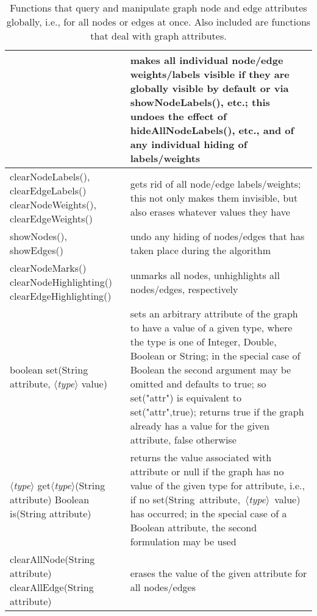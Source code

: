 \begin{table}
\begin{tabular}{| m{} | m{} |}
{    }
    &
    makes all individual
    node/edge weights/labels visible if they are globally visible by default
    or via \textsf{showNodeLabels()}, etc.;
    this undoes the effect of \textsf{hideAllNodeLabels()}, etc., and of
    any individual hiding of labels/weights
    \\ \hline
    \shortstack[l]{
      \textsf{clearNodeLabels(), clearEdgeLabels()}\\
      \textsf{clearNodeWeights(), clearEdgeWeights()}
    }
    &
    gets rid of all node/edge labels/weights; this not only makes them invisible,
    but also erases whatever values they have
    \\ \hline
    \textsf{showNodes(), showEdges()}
    &
    undo any hiding of nodes/edges that has taken place during the algorithm
    \\ \hline
    \shortstack[l]{
      \textsf{clearNodeMarks()}\\
      \textsf{clearNodeHighlighting()}\\
      \textsf{clearEdgeHighlighting()}
    }
    &
    unmarks all nodes, unhighlights all nodes/edges, respectively
    \\ \hline
    \textsf{boolean set(String attribute, $\langle$\emph{type}$\rangle$ value)}
    &
    sets an arbitrary attribute of the graph to have a value of a given type, where
    the type is one of \textsf{Integer}, \textsf{Double}, \textsf{Boolean}
    or \textsf{String};
    in the special case of \textsf{Boolean} the second argument may be omitted
    and defaults to \textsf{true};
    so \textsf{set("attr")} is equivalent to \textsf{set("attr",true)};
    returns \textsf{true} if the graph already has a value for the given attribute,
    \textsf{false} otherwise
    \\ \hline
    \shortstack[l]{
    \textsf{$\langle$\emph{type}$\rangle$ get$\langle$\emph{type}$\rangle$(String attribute)}\\
    \textsf{Boolean is(String attribute)}
    }
    &
    returns the value associated with \textsf{attribute} or \textsf{null}
    if the graph has no value of the given type for \textsf{attribute}, i.e.,
    if no
    \textsf{set(String~attribute,~$\langle$\emph{type}$\rangle$~value)} has occurred;
    in the special case of a \textsf{Boolean} attribute, the second formulation
    may be used
    \\ \hline
    \shortstack[l]{
      \textsf{clearAllNode(String attribute)}\\
      \textsf{clearAllEdge(String attribute)}
    }
    &
    erases the value of the given attribute for all nodes/edges
    \\ \hline
  \end{tabular}

  \caption{Functions that query and manipulate graph
    node and edge attributes globally, i.e., for all nodes or edges
    at once. Also included are functions that deal with graph attributes.}
  \label{tab:graph_attribute_functions}
\end{table}
